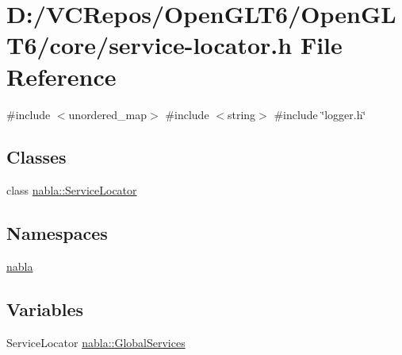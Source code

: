 \hypertarget{service-locator_8h}{}\section{D\+:/\+V\+C\+Repos/\+Open\+G\+L\+T6/\+Open\+G\+L\+T6/core/service-\/locator.h File Reference}
\label{service-locator_8h}
{\ttfamily \#include $<$unordered\+\_\+map$>$}\newline
{\ttfamily \#include $<$string$>$}\newline
{\ttfamily \#include \char`\"{}logger.\+h\char`\"{}}\newline
\subsection*{Classes}
\begin{DoxyCompactItemize}
\item 
class \mbox{\hyperlink{classnabla_1_1_service_locator}{nabla\+::\+Service\+Locator}}
\end{DoxyCompactItemize}
\subsection*{Namespaces}
\begin{DoxyCompactItemize}
\item 
 \mbox{\hyperlink{namespacenabla}{nabla}}
\end{DoxyCompactItemize}
\subsection*{Variables}
\begin{DoxyCompactItemize}
\item 
Service\+Locator \mbox{\hyperlink{namespacenabla_ac9094e134a73575efe47915c9f6b10fc}{nabla\+::\+Global\+Services}}
\end{DoxyCompactItemize}
